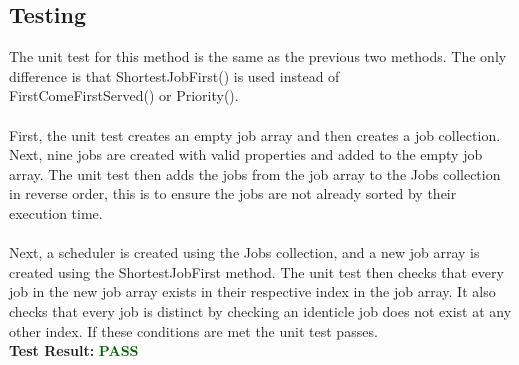 \documentclass[12pt,a4paper]{article}
\begin{document}
		\subsection{Testing}
			The unit test for this method is the same as the previous two methods. The only difference is that 
			ShortestJobFirst() is used instead of\\ FirstComeFirstServed() or Priority().\\\\
			First, the unit test creates an empty job array and then creates a job collection. Next, nine
			jobs are created with valid properties and added to the empty job array. The unit test then adds
			the jobs from the job array to the Jobs collection in reverse order, this is to ensure the jobs
			are not already sorted by their execution time.\\\\
			Next, a scheduler is created using the Jobs collection, and a new job array is created 
			using the ShortestJobFirst method. The unit test then checks that every job in the
			new job array exists in their respective index in the job array. It also checks that every job is
			distinct by checking an identicle job does not exist at any other index. If these conditions 
			are met the unit test passes.\\

			\textbf{Test Result:} \textbf{\textcolor{darkgreen}{PASS}}\\
\end{document}

